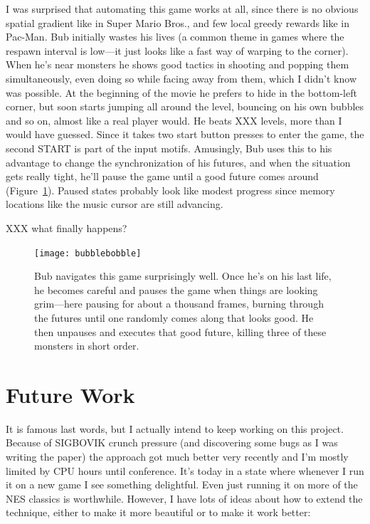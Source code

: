 \documentclass[twocolumn]{article}
\begin{document}
I was surprised that automating this game works at all, since there is
no obvious spatial gradient like in Super Mario Bros., and few local
greedy rewards like in Pac-Man. Bub initially wastes his lives (a
common theme in games where the respawn interval is low---it just
looks like a fast way of warping to the corner). When he's near
monsters he shows good tactics in shooting and popping them
simultaneously, even doing so while facing away from them, which I
didn't know was possible. At the beginning of the movie he prefers to
hide in the bottom-left corner, but soon starts jumping all around the
level, bouncing on his own bubbles and so on, almost like a real
player would. He beats XXX levels, more than I would have guessed.
Since it takes two start button presses to enter the game, the second
START is part of the input motifs. Amusingly, Bub uses this to his
advantage to change the synchronization of his futures, and when the
situation gets really tight, he'll pause the game until a good
future comes around (Figure~\ref{fig:bubblebobble}). Paused states
probably look like modest progress since memory locations like the
music cursor are still advancing.

XXX what finally happens?

\begin{figure}[ht]
\begin{center}
\texttt{[image: bubblebobble]}
\end{center}\vspace{-0.1in}
\caption{Bub navigates this game surprisingly well. Once he's on his
  last life, he becomes careful and pauses the game when things are
  looking grim---here pausing for about a thousand frames, burning
  through the futures until one randomly comes along that looks good.
  He then unpauses and executes that good future, killing three of
  these monsters in short order.}
\label{fig:bubblebobble}
\end{figure}

\section{Future Work}

It is famous last words, but I actually intend to keep working on this
project. Because of SIGBOVIK crunch pressure (and discovering some
bugs as I was writing the paper) the approach got much better very
recently and I'm mostly limited by CPU hours until conference. It's
today in a state where whenever I run it on a new game I see something
delightful. Even just running it on more of the NES classics is
worthwhile. However, I have lots of ideas about how to extend the
technique, either to make it more beautiful or to make it work better:
\end{document}
